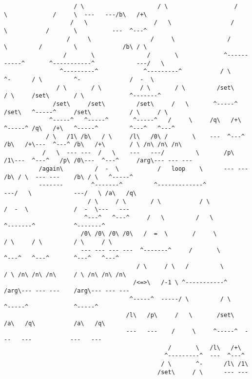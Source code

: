 \documentclass[aip,jcp,reprint,footinbib]{revtex4-1}
\begin{document}
\begin{lstlisting}
                    / \                     / \                   /     \             /     \  ---   ---/b\   /+\
                   /   \                   /   \                 /       \           /       \          ---  ^---^
                  /     \                 /     \               /         \         /         \             /b\ / \
                 /       \               /       \             ^-----------^       ^-----------^            ---/   \
                ^---------^             ^---------^           / \         ^-      / \         ^-              /  -  \
               / \       / \           / \       / \         /set\       / \     /set\       / \             ^-------^
              /set\     /set\         /set\     /   \       ^-----^     /set\   ^-----^     /set\           / \     / \
             ^-----^   ^-----^       ^-----^   /     \     /q\   /+\   ^-----^ /q\   /+\   ^-----^         ^---^   ^---^
            / \   /1\ /b\   / \     /l\   /0\ /       \    ---  ^---^ /b\   /+\---  ^---^ /b\   /+\       / \ /n\ /n\ /n\
           /   \  --- ---  /   \    ---   ---/         \       /p\ /1\---  ^---^   /p\ /0\---  ^---^     /arg\--- --- ---
          /again\         /  -  \           /   loop    \      --- ---    /b\ / \  --- ---    /b\ / \   ^-----^
          -------        ^-------^         ^-------------^                ---/   \            ---/   \ /a\   /q\
                        / \     / \       / \           / \                 /  -  \             /  -  \---   ---
                       ^---^   ^---^     /   \         /   \               ^-------^           ^-------^
                      /0\ /0\ /0\ /0\   /  =  \       /     \             / \     / \         / \     / \
                      --- --- --- ---  ^-------^     /       \           ^---^   ^---^       ^---^   ^---^
                                      / \     / \   /         \         / \ /n\ /n\ /n\     / \ /n\ /n\ /n\
                                     /<=>\   /-1 \ ^-----------^       /arg\--- --- ---    /arg\--- --- ---
                                    ^-----^  -----/ \         / \     ^-----^             ^-----^
                                   /l\   /p\     /   \       /set\   /a\   /q\           /a\   /q\
                                   ---   ---    /     \     ^-----^  ---   ---           ---   ---
                                               /       \   /l\   /+\
                                              ^---------^  ---  ^---^
                                             / \       ^-      /l\ /1\
                                            /set\     / \      --- ---

\end{lstlisting}
\end{document}
